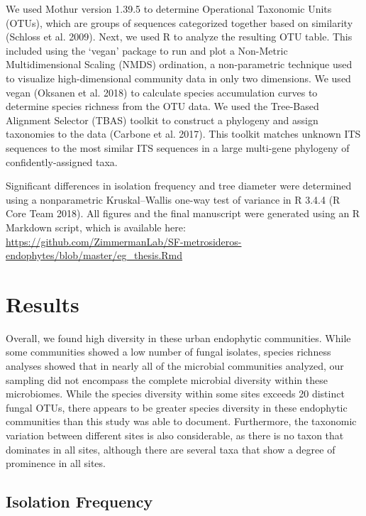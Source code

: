 \documentclass[fleqn,10pt,lineno]{wlpeerj} %
\begin{document}
We used Mothur version 1.39.5 to determine Operational Taxonomic Units (OTUs), which are groups of sequences categorized together based on similarity (Schloss et al. 2009). Next, we used R to analyze the resulting OTU table. This included using the `vegan' package to run and plot a Non-Metric Multidimensional Scaling (NMDS) ordination, a non-parametric technique used to visualize high-dimensional community data in only two dimensions. We used vegan (Oksanen et al. 2018) to calculate species accumulation curves to determine species richness from the OTU data. We used the Tree-Based Alignment Selector (TBAS) toolkit to construct a phylogeny and assign taxonomies to the data (Carbone et al. 2017). This toolkit matches unknown ITS sequences to the most similar ITS sequences in a large multi-gene phylogeny of confidently-assigned taxa.

Significant differences in isolation frequency and tree diameter were determined using a nonparametric Kruskal--Wallis one-way test of variance in R 3.4.4 (R Core Team 2018). All figures and the final manuscript were generated using an R Markdown script, which is available here: \url{https://github.com/ZimmermanLab/SF-metrosideros-endophytes/blob/master/eg_thesis.Rmd}

\hypertarget{results}{%
\section*{Results}\label{results}}

Overall, we found high diversity in these urban endophytic communities. While some communities showed a low number of fungal isolates, species richness analyses showed that in nearly all of the microbial communities analyzed, our sampling did not encompass the complete microbial diversity within these microbiomes. While the species diversity within some sites exceeds 20 distinct fungal OTUs, there appears to be greater species diversity in these endophytic communities than this study was able to document. Furthermore, the taxonomic variation between different sites is also considerable, as there is no taxon that dominates in all sites, although there are several taxa that show a degree of prominence in all sites.

\hypertarget{isolation-frequency}{%
\subsection*{Isolation Frequency}\label{isolation-frequency}}
\end{document}
